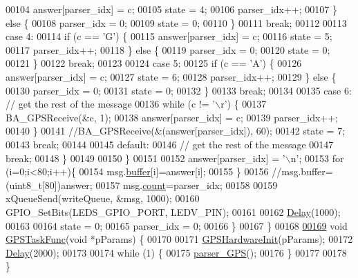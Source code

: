 \begin{DoxyCode}
00104           answer[parser\_idx] = c;
00105           state = 4;
00106           parser\_idx++;
00107         \} \textcolor{keywordflow}{else} \{
00108           parser\_idx = 0;
00109           state = 0;
00110         \}
00111         \textcolor{keywordflow}{break};
00112 
00113       \textcolor{keywordflow}{case} 4:
00114         \textcolor{keywordflow}{if} (c == \textcolor{charliteral}{'G'}) \{
00115           answer[parser\_idx] = c;
00116           state = 5;
00117           parser\_idx++;
00118         \} \textcolor{keywordflow}{else} \{
00119           parser\_idx = 0;
00120           state = 0;
00121         \}
00122         \textcolor{keywordflow}{break};
00123 
00124       \textcolor{keywordflow}{case} 5:
00125         \textcolor{keywordflow}{if} (c == \textcolor{charliteral}{'A'}) \{
00126           answer[parser\_idx] = c;
00127           state = 6;
00128           parser\_idx++;
00129         \} \textcolor{keywordflow}{else} \{
00130           parser\_idx = 0;
00131           state = 0;
00132         \}
00133         \textcolor{keywordflow}{break};
00134 
00135       \textcolor{keywordflow}{case} 6: \textcolor{comment}{// get the rest of the message}
00136         \textcolor{keywordflow}{while} (c != \textcolor{charliteral}{'\(\backslash\)r'}) \{
00137           BA\_GPSReceive(&c, 1);
00138           answer[parser\_idx] = c;
00139           parser\_idx++;
00140         \}
00141         \textcolor{comment}{//BA\_GPSReceive(&(answer[parser\_idx]), 60);}
00142         state = 7;
00143         \textcolor{keywordflow}{break};
00144 
00145       \textcolor{keywordflow}{default}:
00146         \textcolor{comment}{// get the rest of the message}
00147         \textcolor{keywordflow}{break};
00148       \}
00149 
00150     \}
00151 
00152     answer[parser\_idx] = \textcolor{charliteral}{'\(\backslash\)n'};
00153     \textcolor{keywordflow}{for} (i=0;i<80;i++)\{
00154       msg.\hyperlink{structGPS__MSG_ac486c996a8a7a5edd1752baaea5b4571}{buffer}[i]=answer[i];
00155     \}
00156     \textcolor{comment}{//msg.buffer=(uint8\_t[80])answer;}
00157     msg.\hyperlink{structGPS__MSG_a4f0c127ec8708885192496df14c31a71}{count}=parser\_idx;
00158 
00159     xQueueSend(writeQueue, &msg, 1000);
00160     GPIO\_SetBits(LEDS\_GPIO\_PORT, LEDV\_PIN);
00161 
00162     \hyperlink{main_8c_a7d5d5262a3c7d9c39a226ed465e347dc}{Delay}(1000);
00163 
00164     state = 0;
00165     parser\_idx = 0;
00166   \}
00167 \}
00168 
\hypertarget{gps__task_8c_source_l00169}{}\hyperlink{gps__task_8c_abdcfae3302239b75ae41f8d99d7ef7d4}{00169} \textcolor{keywordtype}{void} \hyperlink{gps__task_8c_abdcfae3302239b75ae41f8d99d7ef7d4}{GPSTaskFunc}(\textcolor{keywordtype}{void} *pParams) \{
00170 
00171   \hyperlink{gps__task_8c_ab5a1e3a14590de2541497dd0c38c15a8}{GPSHardwareInit}(pParams);
00172   \hyperlink{main_8c_a7d5d5262a3c7d9c39a226ed465e347dc}{Delay}(2000);
00173 
00174   \textcolor{keywordflow}{while} (1) \{
00175     \hyperlink{gps__task_8c_ac0340e20d1b18f9259b07a8fd719df9f}{parser\_GPS}();
00176   \}
00177 
00178 \}
\end{DoxyCode}
